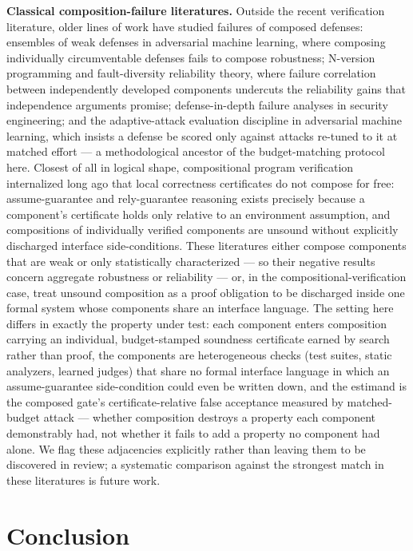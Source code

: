 \documentclass[11pt]{article}
\begin{document}
\textbf{Classical composition-failure literatures.} Outside the recent verification literature, older lines of work have studied failures of composed defenses: ensembles of weak defenses in adversarial machine learning, where composing individually circumventable defenses fails to compose robustness; N-version programming and fault-diversity reliability theory, where failure correlation between independently developed components undercuts the reliability gains that independence arguments promise; defense-in-depth failure analyses in security engineering; and the adaptive-attack evaluation discipline in adversarial machine learning, which insists a defense be scored only against attacks re-tuned to it at matched effort --- a methodological ancestor of the budget-matching protocol here. Closest of all in logical shape, compositional program verification internalized long ago that local correctness certificates do not compose for free: assume-guarantee and rely-guarantee reasoning exists precisely because a component's certificate holds only relative to an environment assumption, and compositions of individually verified components are unsound without explicitly discharged interface side-conditions. These literatures either compose components that are weak or only statistically characterized --- so their negative results concern aggregate robustness or reliability --- or, in the compositional-verification case, treat unsound composition as a proof obligation to be discharged inside one formal system whose components share an interface language. The setting here differs in exactly the property under test: each component enters composition carrying an individual, budget-stamped soundness certificate earned by search rather than proof, the components are heterogeneous checks (test suites, static analyzers, learned judges) that share no formal interface language in which an assume-guarantee side-condition could even be written down, and the estimand is the composed gate's certificate-relative false acceptance measured by matched-budget attack --- whether composition destroys a property each component demonstrably had, not whether it fails to add a property no component had alone. We flag these adjacencies explicitly rather than leaving them to be discovered in review; a systematic comparison against the strongest match in these literatures is future work.

\section{Conclusion}
\end{document}
